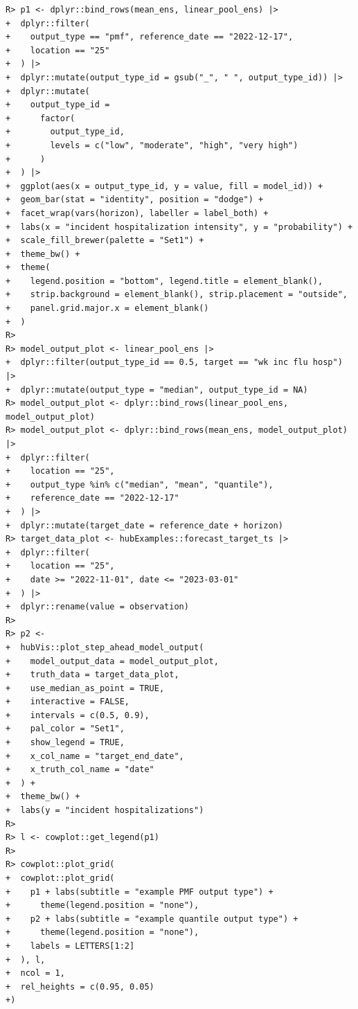 \documentclass[
  article,
  shortnames,
  notitle]{jss}
\begin{document}
\begin{verbatim}
R> p1 <- dplyr::bind_rows(mean_ens, linear_pool_ens) |>
+  dplyr::filter(
+    output_type == "pmf", reference_date == "2022-12-17",
+    location == "25"
+  ) |>
+  dplyr::mutate(output_type_id = gsub("_", " ", output_type_id)) |>
+  dplyr::mutate(
+    output_type_id = 
+      factor(
+        output_type_id,
+        levels = c("low", "moderate", "high", "very high")
+      )
+  ) |>
+  ggplot(aes(x = output_type_id, y = value, fill = model_id)) +
+  geom_bar(stat = "identity", position = "dodge") +
+  facet_wrap(vars(horizon), labeller = label_both) +
+  labs(x = "incident hospitalization intensity", y = "probability") +
+  scale_fill_brewer(palette = "Set1") +
+  theme_bw() +
+  theme(
+    legend.position = "bottom", legend.title = element_blank(),
+    strip.background = element_blank(), strip.placement = "outside",
+    panel.grid.major.x = element_blank()
+  )
R> 
R> model_output_plot <- linear_pool_ens |>
+  dplyr::filter(output_type_id == 0.5, target == "wk inc flu hosp") |>
+  dplyr::mutate(output_type = "median", output_type_id = NA)
R> model_output_plot <- dplyr::bind_rows(linear_pool_ens, model_output_plot)
R> model_output_plot <- dplyr::bind_rows(mean_ens, model_output_plot) |>
+  dplyr::filter(
+    location == "25",
+    output_type %in% c("median", "mean", "quantile"),
+    reference_date == "2022-12-17"
+  ) |>
+  dplyr::mutate(target_date = reference_date + horizon)
R> target_data_plot <- hubExamples::forecast_target_ts |>
+  dplyr::filter(
+    location == "25", 
+    date >= "2022-11-01", date <= "2023-03-01"
+  ) |>
+  dplyr::rename(value = observation)
R> 
R> p2 <-
+  hubVis::plot_step_ahead_model_output(
+    model_output_data = model_output_plot,
+    truth_data = target_data_plot,
+    use_median_as_point = TRUE,
+    interactive = FALSE,
+    intervals = c(0.5, 0.9),
+    pal_color = "Set1",
+    show_legend = TRUE,
+    x_col_name = "target_end_date", 
+    x_truth_col_name = "date"
+  ) +
+  theme_bw() +
+  labs(y = "incident hospitalizations")
R> 
R> l <- cowplot::get_legend(p1)
R> 
R> cowplot::plot_grid(
+  cowplot::plot_grid(
+    p1 + labs(subtitle = "example PMF output type") +
+      theme(legend.position = "none"),
+    p2 + labs(subtitle = "example quantile output type") +
+      theme(legend.position = "none"),
+    labels = LETTERS[1:2]
+  ), l,
+  ncol = 1,
+  rel_heights = c(0.95, 0.05)
+)
\end{verbatim}
\end{document}
